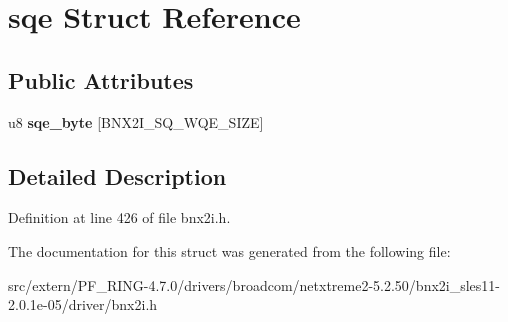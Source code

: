 \hypertarget{structsqe}{
\section{sqe Struct Reference}
\label{structsqe}
}
\subsection*{Public Attributes}
\begin{DoxyCompactItemize}
\item 
\hypertarget{structsqe_a57382bb1c0b5c8f8481015eb346130f9}{
u8 {\bfseries sqe\_\-byte} \mbox{[}BNX2I\_\-SQ\_\-WQE\_\-SIZE\mbox{]}}
\label{structsqe_a57382bb1c0b5c8f8481015eb346130f9}

\end{DoxyCompactItemize}


\subsection{Detailed Description}


Definition at line 426 of file bnx2i.h.



The documentation for this struct was generated from the following file:\begin{DoxyCompactItemize}
\item 
src/extern/PF\_\-RING-\/4.7.0/drivers/broadcom/netxtreme2-\/5.2.50/bnx2i\_\-sles11-\/2.0.1e-\/05/driver/bnx2i.h\end{DoxyCompactItemize}
